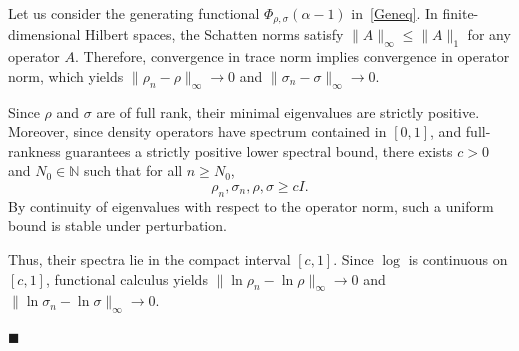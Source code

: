 \documentclass[10pt,a4paper]{amsart}
\renewenvironment{proof}{\noindent{\bfseries Proof.}}{\hfill$\blacksquare$}
\begin{document}
\begin{proof}
Let us consider the generating functional 
$\Phi_{\rho,\sigma}(\alpha-1)$ in~\eqref{Geneq}. In finite-dimensional Hilbert spaces, the Schatten norms satisfy $\|A\|_\infty \le \|A\|_1$ for any operator $A$. Therefore, convergence in trace norm implies convergence in operator norm, which yields $\|\rho_n-\rho\|_\infty \to 0$ and $\|\sigma_n-\sigma\|_\infty \to 0$. 

Since $\rho$ and $\sigma$ are of full rank, their minimal eigenvalues are strictly positive.
Moreover, since density operators have spectrum contained in $[0,1]$, and full-rankness guarantees a strictly positive lower spectral bound, there exists $c>0$ and $N_0 \in \mathbb{N}$ such that for all $n \ge N_0$,
\begin{equation}
\rho_n,\sigma_n,\rho,\sigma \ge cI.
\end{equation}
By continuity of eigenvalues with respect to the operator norm, such a uniform bound is stable under perturbation. 

Thus, their spectra lie in the compact interval $[c,1]$. 
Since $\log$ is continuous on $[c,1]$, functional calculus yields 
$\|\ln\rho_n-\ln\rho\|_\infty \to 0$ and $\|\ln\sigma_n-\ln\sigma\|_\infty \to 0$.


\end{proof}
\end{document}

